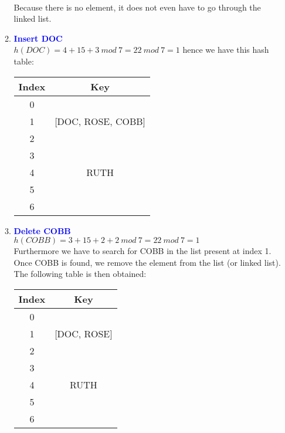 \documentclass[11pt]{article}
\begin{document}
\begin{enumerate}
\begin{enumerate}
        \\ Because there is no element, it does not even have to go through the linked list.
        \\
    \item \textbf{\textcolor{blue}{Insert DOC}}
        \\ $h(DOC)=4+15+3\ mod\ 7 = 22\ mod\ 7 = 1$ hence we have this hash table:
        \begin{center}
        \begin{tabular}{ | c | c | } 
            \hline
            Index & Key \\ 
            \hline\hline
            0 & \\
            \hline
            1 & [DOC, ROSE, COBB]\\
            \hline
            2 & \\
            \hline
            3 & \\
            \hline
            4 & RUTH\\
            \hline
            5 & \\
            \hline
            6 & \\
            \hline
        \end{tabular}
        \end{center}
    \item \textbf{\textcolor{blue}{Delete COBB}}
        \\ $h(COBB)=3+15+2+2\ mod\ 7 = 22\ mod\ 7 = 1$
        \\ Furthermore we have to search for COBB in the list present at index 1.
        \\ Once COBB is found, we remove the element from the list (or linked list).
        \\ The following table is then obtained:
        \begin{center}
        \begin{tabular}{ | c | c | } 
            \hline
            Index & Key \\ 
            \hline\hline
            0 & \\
            \hline
            1 & [DOC, ROSE]\\
            \hline
            2 & \\
            \hline
            3 & \\
            \hline
            4 & RUTH\\
            \hline
            5 & \\
            \hline
            6 & \\
            \hline
        \end{tabular}
        \end{center}
    \end{enumerate}
    

\end{enumerate}
\end{document}
